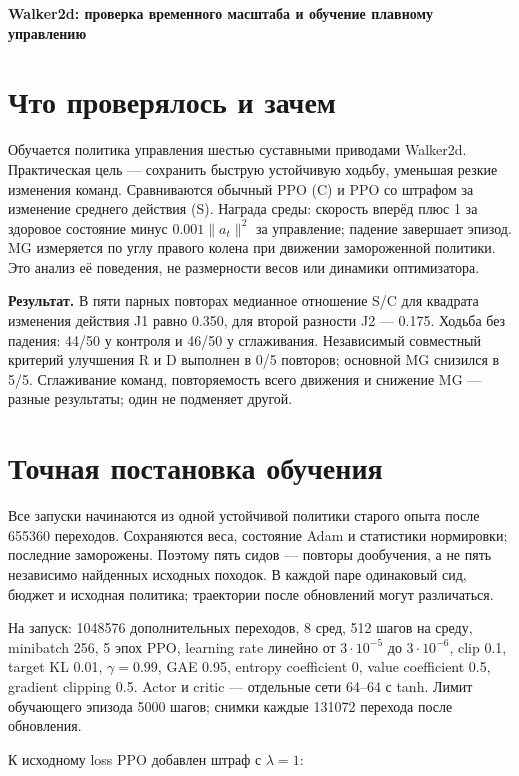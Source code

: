 \documentclass[10pt,a4paper]{article}
\begin{document}
{\Large\bfseries Walker2d: проверка временного масштаба и обучение плавному управлению}\par\medskip

\section*{Что проверялось и зачем}

Обучается политика управления шестью суставными приводами Walker2d. Практическая цель --- сохранить быструю устойчивую ходьбу, уменьшая резкие изменения команд. Сравниваются обычный PPO (C) и PPO со штрафом за изменение среднего действия (S). Награда среды: скорость вперёд плюс 1 за здоровое состояние минус $0.001\|a_t\|^2$ за управление; падение завершает эпизод. MG измеряется по углу правого колена при движении замороженной политики. Это анализ её поведения, не размерности весов или динамики оптимизатора.

\textbf{Результат.} В пяти парных повторах медианное отношение S/C для квадрата изменения действия J1 равно 0.350, для второй разности J2 --- 0.175. Ходьба без падения: 44/50 у контроля и 46/50 у сглаживания. Независимый совместный критерий улучшения R и D выполнен в 0/5 повторов; основной MG снизился в 5/5. Сглаживание команд, повторяемость всего движения и снижение MG --- разные результаты; один не подменяет другой.

\section*{Точная постановка обучения}

Все запуски начинаются из одной устойчивой политики старого опыта после 655360 переходов. Сохраняются веса, состояние Adam и статистики нормировки; последние заморожены. Поэтому пять сидов --- повторы дообучения, а не пять независимо найденных исходных походок. В каждой паре одинаковый сид, бюджет и исходная политика; траектории после обновлений могут различаться.

На запуск: 1048576 дополнительных переходов, 8 сред, 512 шагов на среду, minibatch 256, 5 эпох PPO, learning rate линейно от $3\cdot10^{-5}$ до $3\cdot10^{-6}$, clip 0.1, target KL 0.01, $\gamma=0.99$, GAE 0.95, entropy coefficient 0, value coefficient 0.5, gradient clipping 0.5. Actor и critic --- отдельные сети 64--64 с tanh. Лимит обучающего эпизода 5000 шагов; снимки каждые 131072 перехода после обновления.

К исходному loss PPO добавлен штраф с $\lambda=1$:
\end{document}

